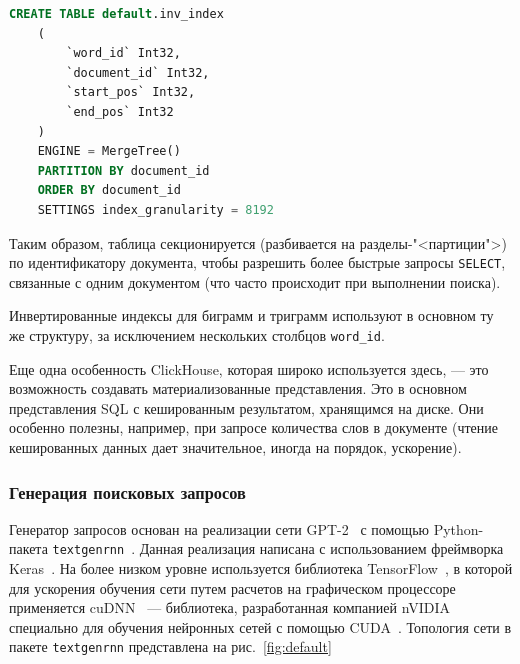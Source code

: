 \begin{lstlisting}[language=SQL]
    CREATE TABLE default.inv_index
    (
        `word_id` Int32,
        `document_id` Int32,
        `start_pos` Int32,
        `end_pos` Int32
    )
    ENGINE = MergeTree()
    PARTITION BY document_id
    ORDER BY document_id
    SETTINGS index_granularity = 8192
\end{lstlisting}

Таким образом, таблица секционируется (разбивается на разделы-"<партиции">) по идентификатору документа, чтобы разрешить
более быстрые запросы \texttt{SELECT}, связанные с одним документом (что часто происходит при выполнении поиска).

Инвертированные индексы для биграмм и триграмм используют в основном ту же структуру, за исключением нескольких столбцов
\texttt{word\_id}.

Еще одна особенность ClickHouse, которая широко используется здесь, --- это возможность создавать материализованные представления.
Это в основном представления SQL с кешированным результатом, хранящимся на диске. Они особенно полезны, например, при запросе
количества слов в документе (чтение кешированных данных дает значительное, иногда на порядок, ускорение).

\subsubsection{Генерация поисковых запросов}
Генератор запросов основан на реализации сети GPT-2~\cite{radford2019language} с помощью Python-пакета \texttt{textgenrnn}~\cite{TextgenRNN2020}. 
Данная реализация написана с использованием фреймворка Keras~\cite{chollet2015keras}. На более низком уровне используется
библиотека TensorFlow~\cite{tensorflow2015-whitepaper}, в которой для ускорения обучения сети путем расчетов на графическом процессоре
применяется cuDNN~\cite{DBLP:journals/corr/ChetlurWVCTCS14} --- библиотека, разработанная компанией nVIDIA специально для 
обучения нейронных сетей с помощью CUDA~\cite{cuda}. Топология сети в пакете \texttt{textgenrnn} представлена на рис.~\ref{fig:default}

